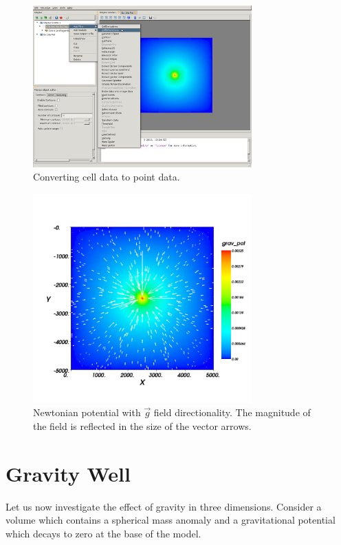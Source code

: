 \begin{figure}[ht]
\centering
\includegraphics[width=0.75\textwidth]{figures/mayavi2_cell2point.png}
\caption{Converting cell data to point data.}
\label{fig:mayavi2cell2point}
\end{figure}

\begin{figure}[ht]
\centering
\includegraphics[width=0.75\textwidth]{figures/ex10apot.png}
\caption{Newtonian potential with $\vec{g}$ field directionality. The magnitude
of the field is reflected in the size of the vector arrows.}
\label{fig:ex10pot}
\end{figure}
\clearpage

\section{Gravity Well}
Let us now investigate the effect of gravity in three dimensions. Consider a
volume which contains a spherical mass anomaly and a gravitational potential
which decays to zero at the base of the model.

